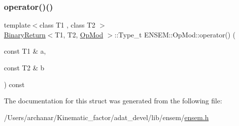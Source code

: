 \mbox{\label{structENSEM_1_1OpMod_ab377d613c8fa223caa60de3292a55685}} 
\subsubsection{\texorpdfstring{operator()()}{operator()()}\hspace{0.1cm}{\footnotesize\ttfamily [2/2]}}
{\footnotesize\ttfamily template$<$class T1 , class T2 $>$ \\
\mbox{\hyperlink{structENSEM_1_1BinaryReturn}{Binary\+Return}}$<$T1, T2, \mbox{\hyperlink{structENSEM_1_1OpMod}{Op\+Mod}} $>$\+::Type\+\_\+t E\+N\+S\+E\+M\+::\+Op\+Mod\+::operator() (\begin{DoxyParamCaption}\item[{const T1 \&}]{a,  }\item[{const T2 \&}]{b }\end{DoxyParamCaption}) const\hspace{0.3cm}{\ttfamily [inline]}}



The documentation for this struct was generated from the following file\+:\begin{DoxyCompactItemize}
\item 
/\+Users/archanar/\+Kinematic\+\_\+factor/adat\+\_\+devel/lib/ensem/\mbox{\hyperlink{lib_2ensem_2ensem_8h}{ensem.\+h}}\end{DoxyCompactItemize}
